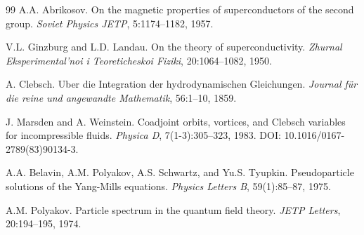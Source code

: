 \documentclass[11pt,a4paper]{article}
\begin{document}
\begin{thebibliography}{99}
		A.A. Abrikosov.
		\newblock On the magnetic properties of superconductors of the second group.
		\newblock \textit{Soviet Physics JETP}, 5:1174--1182, 1957.
		
		V.L. Ginzburg and L.D. Landau.
		\newblock On the theory of superconductivity.
		\newblock \textit{Zhurnal Eksperimental'noi i Teoreticheskoi Fiziki}, 20:1064--1082, 1950.
		
		A. Clebsch.
		\newblock Uber die Integration der hydrodynamischen Gleichungen.
		\newblock \textit{Journal für die reine und angewandte Mathematik}, 56:1--10, 1859.
		
		J. Marsden and A. Weinstein.
		\newblock Coadjoint orbits, vortices, and Clebsch variables for incompressible fluids.
		\newblock \textit{Physica D}, 7(1-3):305--323, 1983.
		\newblock DOI: 10.1016/0167-2789(83)90134-3.
		
		A.A. Belavin, A.M. Polyakov, A.S. Schwartz, and Yu.S. Tyupkin.
		\newblock Pseudoparticle solutions of the Yang-Mills equations.
		\newblock \textit{Physics Letters B}, 59(1):85--87, 1975.
		
		A.M. Polyakov.
		\newblock Particle spectrum in the quantum field theory.
		\newblock \textit{JETP Letters}, 20:194--195, 1974.
		
	\end{thebibliography}
	
\end{document}
